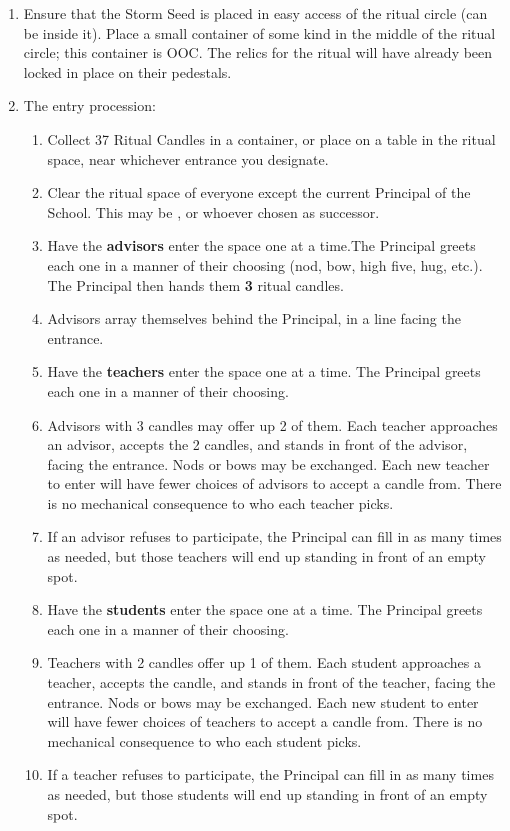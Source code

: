 \documentclass[green]{GL2020}
\begin{document}
\begin{enumerate}
	\item Ensure that the Storm Seed is placed in easy access of the ritual circle (can be inside it). Place a small container of some kind in the middle of the ritual circle; this container is OOC. The relics for the ritual will have already been locked in place on their pedestals.
\item The entry procession:
	\begin{enumerate}
\item Collect 37 Ritual Candles in a container, or place on a table in the ritual space, near whichever entrance you designate.
\item Clear the ritual space of everyone except the current Principal of the School. This may be \cPrincipal{}, or whoever \cPrincipal{\theyhave} chosen as \cPrincipal{\their} successor.
\item Have the \textbf{advisors} enter the space one at a time.The Principal greets each one in a manner of their choosing (nod, bow, high five, hug, etc.). The Principal then hands them \textbf{3} ritual candles.
\item Advisors array themselves behind the Principal, in a line facing the entrance.
\item Have the \textbf{teachers} enter the space one at a time. The Principal greets each one in a manner of their choosing.
\item Advisors with 3 candles may offer up 2 of them.  Each teacher approaches an advisor, accepts the 2 candles, and stands in front of the advisor, facing the entrance. Nods or bows may be exchanged. Each new teacher to enter will have fewer choices of advisors to accept a candle from. There is no mechanical consequence to who each teacher picks.
\item If an advisor refuses to participate, the Principal can fill in as many times as needed, but those teachers will end up standing in front of an empty spot.
\item Have the \textbf{students} enter the space one at a time. The Principal greets each one in a manner of their choosing.
\item Teachers with 2 candles offer up 1 of them. Each student approaches a teacher, accepts the candle, and stands in front of the teacher, facing the entrance. Nods or bows may be exchanged. Each new student to enter will have fewer choices of teachers to accept a candle from. There is no mechanical consequence to who each student picks.
\item If a teacher refuses to participate, the Principal can fill in as many times as needed, but those students will end up standing in front of an empty spot.

\end{enumerate}
\end{enumerate}
\end{document}
